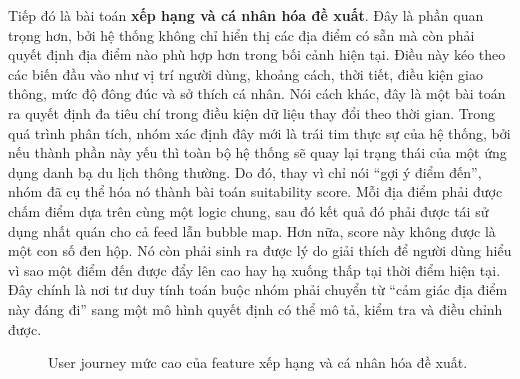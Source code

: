 Tiếp đó là bài toán \textbf{xếp hạng và cá nhân hóa đề xuất}.
Đây là phần quan trọng hơn, bởi hệ thống không chỉ hiển thị các địa điểm có
sẵn mà còn phải quyết định địa điểm nào phù hợp hơn trong bối cảnh hiện
tại. Điều này kéo theo các biến đầu vào như vị trí người dùng, khoảng
cách, thời tiết, điều kiện giao thông, mức độ đông đúc và sở thích cá
nhân. Nói cách khác, đây là một bài toán ra quyết định đa tiêu chí trong
điều kiện dữ liệu thay đổi theo thời gian. Trong quá trình phân tích,
nhóm xác định đây mới là trái tim thực sự của hệ thống, bởi nếu thành
phần này yếu thì toàn bộ hệ thống sẽ quay lại trạng thái của một ứng
dụng danh bạ du lịch thông thường. Do đó, thay vì chỉ nói ``gợi ý điểm
đến'', nhóm đã cụ thể hóa nó thành bài toán suitability score. Mỗi địa
điểm phải được chấm điểm dựa trên cùng một logic chung, sau đó kết quả
đó phải được tái sử dụng nhất quán cho cả feed lẫn bubble map. Hơn nữa,
score này không được là một con số đen hộp. Nó còn phải sinh ra được lý
do giải thích để người dùng hiểu vì sao một điểm đến được đẩy lên cao
hay hạ xuống thấp tại thời điểm hiện tại. Đây chính là nơi tư duy tính
toán buộc nhóm phải chuyển từ ``cảm giác địa điểm này đáng đi'' sang một
mô hình quyết định có thể mô tả, kiểm tra và điều chỉnh được.

\begin{figure}[H]
\centering
{}
\caption{User journey mức cao của feature xếp hạng và cá nhân hóa đề xuất.}
\label{fig:journey_recommendation}
\end{figure}

